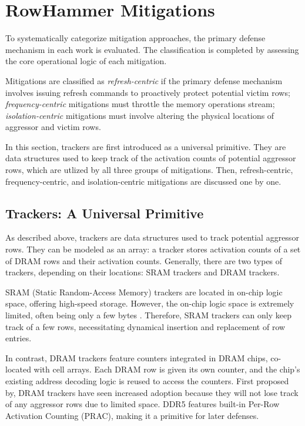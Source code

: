 \documentclass[journal,twocolumn]{IEEEtran}
\begin{document}
\section{RowHammer Mitigations}\label{sec:mitigation}

To systematically categorize mitigation approaches, the primary defense mechanism in each work is evaluated. The classification is completed by assessing the core operational logic of each mitigation.

Mitigations are classified as \textit{refresh-centric} if the primary defense mechanism involves issuing refresh commands to proactively protect potential victim rows; \textit{frequency-centric} mitigations must throttle the memory operations stream; \textit{isolation-centric} mitigations must involve altering the physical locations of aggressor and victim rows.

In this section, trackers are first introduced as a universal primitive. They are data structures used to keep track of the activation counts of potential aggressor rows, which are utlized by all three groups of mitigations. Then, refresh-centric, frequency-centric, and isolation-centric mitigations are discussed one by one.

\subsection{Trackers: A Universal Primitive}\label{sec:tracker}

As described above, trackers are data structures used to track potential aggressor rows. They can be modeled as an array: a tracker stores activation counts of a set of DRAM rows and their activation counts. Generally, there are two types of trackers, depending on their locations: SRAM trackers and DRAM trackers. 

SRAM (Static Random-Access Memory) trackers are located in on-chip logic space, offering high-speed storage. However, the on-chip logic space is extremely limited, often being only a few bytes\cite{Qureshi24} . Therefore, SRAM trackers can only keep track of a few rows\cite{Hajiabadi25}, necessitating dynamical insertion and replacement of row entries. 

In contrast, DRAM trackers feature counters integrated in DRAM chips, co-located with cell arrays. Each DRAM row is given its own counter, and the chip's existing address decoding logic is reused to access the counters. First proposed by\cite{Bennett2021}, DRAM trackers have seen increased adoption because they will not lose track of any aggressor rows due to limited space. DDR5 features built-in Per-Row Activation Counting (PRAC), making it a primitive for later defenses\cite{JESD79-5C}.
\end{document}

